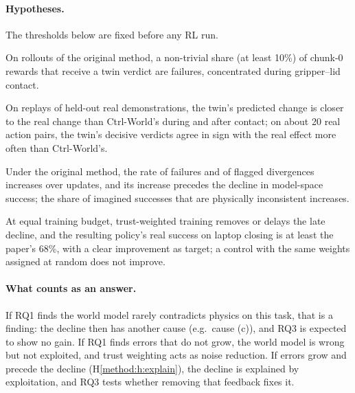 \paragraph{Hypotheses.} The thresholds below are fixed before any RL run.
\begin{hypothesis}[Detect]\label{method:h:detect}
On rollouts of the original method, a non-trivial share (at least 10\%) of chunk-0 rewards that receive a twin verdict are failures, concentrated during gripper--lid contact.
\end{hypothesis}
\begin{hypothesis}\label{method:h:valid}
On replays of held-out real demonstrations, the twin's predicted change is closer to the real change than Ctrl-World's during and after contact; on about 20 real action pairs, the twin's decisive verdicts agree in sign with the real effect more often than Ctrl-World's.
\end{hypothesis}
\begin{hypothesis}[Explain]\label{method:h:explain}
Under the original method, the rate of failures and of flagged divergences increases over updates, and its increase precedes the decline in model-space success; the share of imagined successes that are physically inconsistent increases.
\end{hypothesis}
\begin{hypothesis}[Improve]\label{method:h:improve}
At equal training budget, trust-weighted training removes or delays the late decline, and the resulting policy's real success on laptop closing is at least the paper's 68\%, with a clear improvement as target; a control with the same weights assigned at random does not improve.
\end{hypothesis}

\paragraph{What counts as an answer.} If RQ1 finds the world model rarely contradicts physics on this task, that is a finding: the decline then has another cause (e.g.\ cause (c)), and RQ3 is expected to show no gain. If RQ1 finds errors that do not grow, the world model is wrong but not exploited, and trust weighting acts as noise reduction. If errors grow and precede the decline (H\ref{method:h:explain}), the decline is explained by exploitation, and RQ3 tests whether removing that feedback fixes it.

